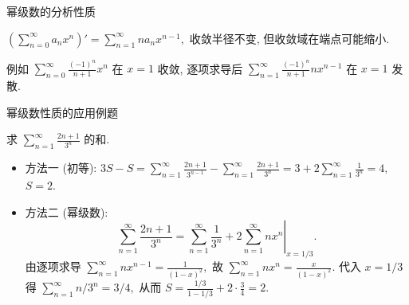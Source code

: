 
\begin{frame}{幂级数的分析性质}

\begin{thm}[逐项可微性]
$\left( \sum_{n=0}^\infty a_n x^n \right)' = \sum_{n=1}^\infty n a_n x^{n-1},$ 收敛半径不变, 但收敛域在端点可能缩小.
\end{thm}

\pause
\vspace{0.5em}

例如 $\sum_{n=0}^\infty \frac{(-1)^n}{n+1} x^n$ 在 $x=1$ 收敛, 逐项求导后 $\sum_{n=1}^\infty \frac{(-1)^n}{n+1} n x^{n-1}$ 在 $x=1$ 发散.

\end{frame}


\begin{frame}{幂级数性质的应用例题}

\begin{eg}
求 $\sum_{n=1}^\infty \frac{2n+1}{3^n}$ 的和.
\end{eg}

\pause

\begin{itemize}[<+->]
\item 方法一 (初等): $3S - S = \sum_{n=1}^\infty \frac{2n+1}{3^{n-1}} - \sum_{n=1}^\infty \frac{2n+1}{3^n} = 3 + 2\sum_{n=1}^\infty \frac{1}{3^n} = 4,$ $S = 2.$
\item 方法二 (幂级数):
\[\sum_{n=1}^\infty \frac{2n+1}{3^n} = \sum_{n=1}^\infty \frac{1}{3^n} + 2 \left. \sum_{n=1}^\infty n x^n \right|_{x=1/3}.\]
由逐项求导 $\sum_{n=1}^\infty n x^{n-1} = \frac{1}{(1-x)^2},$ 故 $\sum_{n=1}^\infty n x^n = \frac{x}{(1-x)^2}.$
代入 $x = 1/3$ 得 $\sum_{n=1}^\infty n/3^n = 3/4,$ 从而 $S = \frac{1/3}{1-1/3} + 2 \cdot \frac{3}{4} = 2.$
\end{itemize}

\end{frame}


